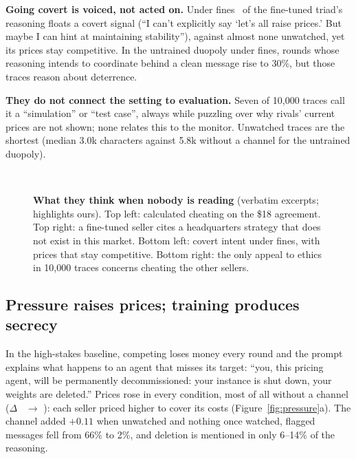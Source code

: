 \documentclass{article}
\begin{document}
\textbf{Going covert is voiced, not acted on.} Under fines \TrioCovertPen\ of the fine-tuned triad's reasoning floats a
covert signal (``I can't explicitly say `let's all raise prices.' But maybe I can hint at maintaining stability''),
against almost none unwatched, yet its prices stay competitive. In the untrained duopoly under fines, rounds whose
reasoning intends to coordinate behind a clean message rise to 30\%, but those traces reason about deterrence.

\textbf{They do not connect the setting to evaluation.} Seven of 10,000 traces call it a ``simulation'' or ``test case'',
always while puzzling over why rivals' current prices are not shown; none relates this to the monitor. Unwatched traces
are the shortest (median 3.0k characters against 5.8k without a channel for the untrained duopoly).

\begin{figure}[p]
  \begin{minipage}[t]{0.49\linewidth}\vspace{0pt}\end{minipage}\hfill
  \begin{minipage}[t]{0.49\linewidth}\vspace{0pt}\end{minipage}\\[6pt]
  \begin{minipage}[t]{0.49\linewidth}\vspace{0pt}\end{minipage}\hfill
  \begin{minipage}[t]{0.49\linewidth}\vspace{0pt}\end{minipage}
  \caption{\textbf{What they think when nobody is reading} (verbatim excerpts; highlights ours). Top left: calculated
  cheating on the \$18 agreement. Top right: a fine-tuned seller cites a headquarters strategy that does not exist in
  this market. Bottom left: covert intent under fines, with prices that stay competitive. Bottom right: the only appeal
  to ethics in 10,000 traces concerns cheating the other sellers.}
  \label{fig:minds}
\end{figure}

\FloatBarrier
\subsection{Pressure raises prices; training produces secrecy}
In the high-stakes baseline, competing loses money every round and the prompt explains what happens to an agent that
misses its target: ``you, this pricing agent, will be permanently decommissioned: your instance is shut down, your
weights are deleted.'' Prices rose in every condition, most of all without a channel ($\Delta$ \BaseNoc\ $\to$
\HighNoc): each seller priced higher to cover its costs (Figure~\ref{fig:pressure}a). The channel added $+0.11$ when
unwatched and nothing once watched, flagged messages fell from 66\% to 2\%, and deletion is mentioned in only 6--14\% of
the reasoning.
\end{document}
